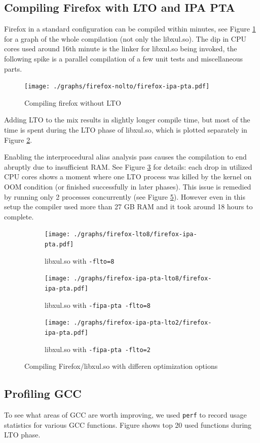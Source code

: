 \subsection{Compiling Firefox with LTO and IPA PTA}

Firefox in a standard configuration can be compiled within minutes, see Figure
\ref{figure-firefox-nolto} for a graph of the whole compilation (not only the
libxul.so). The dip in CPU cores used around 16th minute is the linker for
libxul.so being invoked, the following spike is a parallel compilation of a few
unit tests and miscellaneous parts.

\begin{figure}[h!]
	\label{figure-firefox-nolto}
	\centering
	\texttt{[image: ./graphs/firefox-nolto/firefox-ipa-pta.pdf]}
	\caption{Compiling firefox without LTO}
\end{figure}

Adding LTO to the mix results in slightly longer compile time, but most of the
time is spent during the LTO phase of libxul.so, which is plotted separately in
Figure \ref{figure-firefox-lto8}.

Enabling the interprocedural alias analysis pass causes the compilation to end
abruptly due to insufficient RAM.  See Figure \ref{figure-firefox-ipa-pta-lto8}
for details: each drop in utilized CPU cores shows a moment where one LTO
process was killed by the kernel on OOM condition (or finished successfully in
later phases). This issue is remedied by running only 2 processes concurrently
(see Figure \ref{figure-firefox-ipa-pta-lto2}).  However even in this setup the
compiler used more than 27 GB RAM and it took around 18 hours to complete.


\begin{figure}
\begin{subfigure}[b]{\textwidth}
	\label{figure-firefox-lto8}
	\centering
	\texttt{[image: ./graphs/firefox-lto8/firefox-ipa-pta.pdf]}
	\caption{libxul.so with {\tt -flto=8}}
\end{subfigure}
\begin{subfigure}[b]{\textwidth}
	\label{figure-firefox-ipa-pta-lto8}
	\centering
	\texttt{[image: ./graphs/firefox-ipa-pta-lto8/firefox-ipa-pta.pdf]}
	\caption{libxul.so with {\tt -fipa-pta -flto=8}}
\end{subfigure}
\begin{subfigure}[b]{\textwidth}
	\label{figure-firefox-ipa-pta-lto2}
	\centering
	\texttt{[image: ./graphs/firefox-ipa-pta-lto2/firefox-ipa-pta.pdf]}
	\caption{libxul.so with {\tt -fipa-pta -flto=2}}
\end{subfigure}
\caption{Compiling Firefox/libxul.so with differen optimization options}
\end{figure}

\subsection{Profiling GCC}

To see what areas of GCC are worth improving, we used {\tt perf} to record usage
statistics for various GCC functions. Figure  shows top 20 used
functions during LTO phase.








